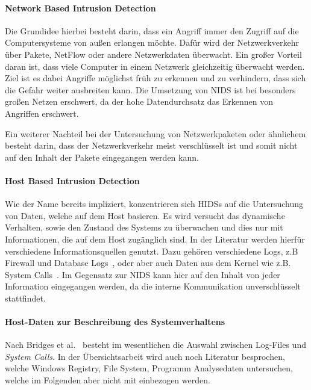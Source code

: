             \paragraph{Network Based Intrusion Detection}
                Die Grundidee hierbei besteht darin, dass ein Angriff immer den Zugriff auf die Computersysteme von außen erlangen möchte.
                Dafür wird der Netzwerkverkehr über Pakete, NetFlow oder andere Netzwerkdaten überwacht.
                Ein großer Vorteil daran ist, dass viele Computer in einem Netzwerk gleichzeitig überwacht werden.
                Ziel ist es dabei Angriffe möglichst früh zu erkennen und zu verhindern, dass sich die Gefahr weiter ausbreiten kann.
                Die Umsetzung von \ac{NIDS} ist bei besonders großen Netzen erschwert, da der hohe Datendurchsatz das Erkennen von Angriffen erschwert.~\cite{NIDS}

                Ein weiterer Nachteil bei der Untersuchung von Netzwerkpaketen oder ähnlichem besteht darin, dass der Netzwerkverkehr meist verschlüsselt ist und somit nicht auf den Inhalt der Pakete eingegangen werden kann.

            \paragraph{Host Based Intrusion Detection}
                Wie der Name bereits impliziert, konzentrieren sich \acp{HIDS} auf die Untersuchung von Daten, welche auf dem Host basieren.%
                Es wird versucht das dynamische Verhalten, sowie den Zustand des Systems zu überwachen und dies nur mit Informationen, die auf dem Host zugänglich sind.%
                In der Literatur werden hierfür verschiedene Informationsquellen genutzt.
                Dazu gehören verschiedene Logs, z.B Firewall und Database Logs~\cite{IDSsurvey},
                oder aber auch Daten aus dem Kernel wie z.B. System Calls~\cite{MAGGI}.
                Im Gegensatz zur \ac{NIDS} kann hier auf den Inhalt von jeder Information eingegangen werden, da die interne Kommunikation unverschlüsselt stattfindet.~\cite{OSSECBRAY2008}

            \paragraph{Host-Daten zur Beschreibung des Systemverhaltens}
                 
                Nach Bridges et al.~\cite{HIDSSURVEY2019bridges} besteht im wesentlichen die Auswahl zwischen Log-Files und \textit{System Calls}.
                In der Übersichtsarbeit wird auch noch Literatur besprochen, welche Windows Registry, File System, Programm Analysedaten untersuchen, welche im Folgenden aber nicht mit einbezogen werden.

